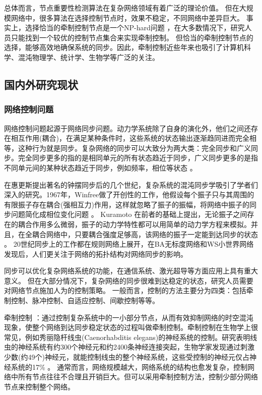 总体而言，节点重要性检测算法在复杂网络领域有着广泛的理论价值。
但在大规模网络中，很多算法在选择控制节点时，效果不稳定，不同网络中差异巨大。
事实上，选择恰当的牵制控制节点是一个NP-hard问题 \cite{Morone2015} ，在大多数情况下，研究人员只能找到一个较优的控制节点集合来实现牵制控制。
但恰当的牵制控制节点的选择，能够高效地确保系统的同步。因此，牵制控制近些年来也吸引了计算机科学、混沌物理学、统计学、生物学等广泛的关注。

\subsection{国内外研究现状}

\subsubsection{网络控制问题}

网络控制问题起源于网络同步问题。动力学系统除了自身的演化外，他们之间还存在相互作用(耦合)，在满足某种条件时，这些系统的状态输出逐渐趋同进而完全相等，这种行为就是同步。复杂网络的同步可以大致分为两大类：完全同步和广义同步。完全同步更多的指的是相同单元的所有状态趋近于同步，广义同步更多的是指不同单元间的某种状态趋近于同步，例如频率，相位等状态 \cite{汪小帆2006}。

在惠更斯提出著名的钟摆同步后的几个世纪，复杂系统的混沌同步学吸引了学者们深入的研究。1967年，Winfree做了开创性的工作，他假设每个振子只与其周围的有限振子存在耦合(强相互力)作用，这样就忽略了振子的振幅，将网络中振子的同步问题简化成相位变化问题 \cite{Ariaratnam2001}。
Kuramoto 在前者的基础上提出，无论振子之间存在的耦合作用多么微弱，振子的动力学特性都可以用简单的动力学方程来模拟。并且，在全耦合网络中，只要耦合强度足够高，该网络的振子一定能到达同步的状态 \cite{Rodrigues2016}。
20世纪同步上的工作都在规则网络上展开，在BA无标度网络和WS小世界网络发现后，人们更关注于网络的拓扑结构对网络同步的影响。

同步可以优化复杂网络系统的功能，在通信系统、激光超导等方面应用上具有重大意义。
但在大部分情况下，复杂网络的同步很难到达稳定的状态，研究人员需要对网络节点施加人为的控制策略。
一般而言，控制的方法主要分为四类：包括牵制控制、脉冲控制、自适应控制、间歇控制等等。

牵制控制 \cite{Grigoriev1997}：通过控制复杂系统中的一小部分节点，从而有效抑制网络的时空混沌现象，使整个网络到达同步稳定状态的过程叫做牵制控制。牵制控制在生物学上很常见，例如秀丽隐杆线虫(Caenorhabditis elegans)的神经系统的控制。研究表明线虫的神经系统有约300个神经元和约2400条神经连接突起，生物学家发现通过刺激少数(约49个)神经元，就能控制线虫的整个神经系统，这些受控制的神经元仅占神经系统的17\% \cite{Chen2014}。 通常而言，网络规模越大，网络系统的结构也愈发复杂，控制网络中所有节点往往不合理且开销巨大。但可以采用牵制控制方法，控制少部分网络节点来控制整个网络。

